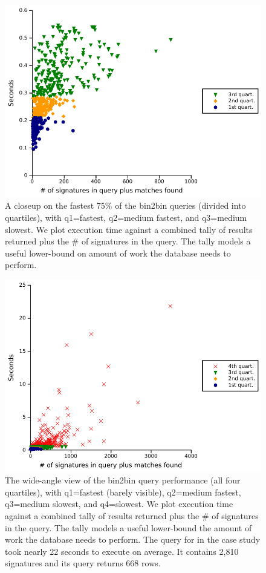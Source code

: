 \begin{figure}[h]
\centering
\includegraphics[width=40em]{plots/a.pdf}
\caption{\small{A closeup on the fastest 75\% of the bin2bin queries (divided
into quartiles), with q1=fastest, q2=medium fastest, and q3=medium
slowest.  We plot execution time against a combined tally of results
returned plus the \# of signatures in the query.  The tally
models a useful lower-bound on amount of work the database needs to perform.}
}
\label{fig:perfBin2Bin3quartiles}
\end{figure}
\begin{figure}[h]
\centering
\includegraphics[width=40em]{plots/b.pdf}
\vspace{-2mm}
\caption{\small{The wide-angle view of the bin2bin query performance (all four
quartiles), with q1=fastest (barely visible), q2=medium fastest,
q3=medium slowest, and q4=slowest.  We plot execution time against a
combined tally of results returned plus the \# of signatures in the
query.  The tally models a useful lower-bound the amount of work the database needs to
perform.  The query for  in the case study
took nearly 22 seconds to execute on average.  It contains 2,810
signatures and its query returns 668 rows.}
}
\label{fig:perfBin2Bin}
\end{figure}



